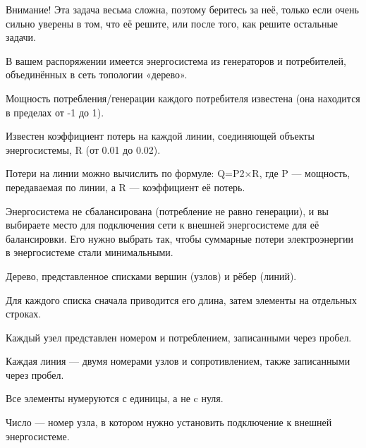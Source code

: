 
Внимание! Эта задача весьма сложна, поэтому беритесь за неё, только если очень сильно уверены в том, что её решите, или после того, как решите остальные задачи.

В вашем распоряжении имеется энергосистема из генераторов и потребителей, объединённых в сеть топологии «дерево».

Мощность потребления/генерации каждого потребителя известена (она находится в пределах от -1 до 1).

Известен коэффициент потерь на каждой линии, соединяющей объекты энергосистемы, R (от 0.01 до 0.02).

Потери на линии можно вычислить по формуле: Q=P2×R, где P — мощность, передаваемая по линии, а R — коэффициент её потерь.


Энергосистема не сбалансирована (потребление не равно генерации), и вы выбираете место для подключения сети к внешней энергосистеме для её балансировки. Его нужно выбрать так, чтобы суммарные потери электроэнергии в энергосистеме стали минимальными.


Дерево, представленное списками вершин (узлов) и рёбер (линий).

Для каждого списка сначала приводится его длина, затем элементы на отдельных строках.

Каждый узел представлен номером и потреблением, записанными через пробел.

Каждая линия — двумя номерами узлов и сопротивлением, также записанными через пробел.

Все элементы нумеруются с единицы, а не c нуля.

\outputfmtSection

Число — номер узла, в котором нужно установить подключение к внешней энергосистеме.


